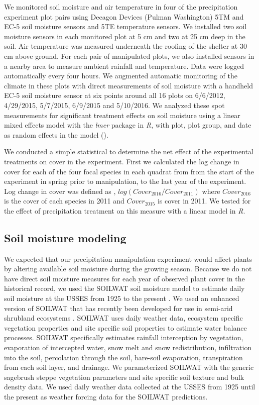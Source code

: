 \documentclass[11pt]{article}
\begin{document}
\begin{doublespace}
We monitored soil moisture and air temperature in four of the precipitation experiment plot pairs using Decagon Devices (Pulman Washington) 5TM and EC-5 soil moisture sensors and 5TE temperature sensors.  We installed two soil moisture sensors in each monitored plot at 5 cm and two at 25 cm deep in the soil.  Air temperature was measured underneath the roofing of the shelter at 30 cm above ground. For each pair of manipulated plots, we also installed sensors in a nearby area to measure ambient rainfall and temperature. Data were logged automatically every four hours. We augmented automatic monitoring of the climate in these plots with direct measurements of soil moisture with a handheld EC-5 soil moisture sensor at six points around all 16 plots on 6/6/2012, 4/29/2015, 5/7/2015, 6/9/2015 and 5/10/2016. We analyzed these spot measurements for significant treatment effects on soil moisture using a linear mixed effects model with the \textit{lmer} package in \textit{R}, with plot, plot group, and date as random effects in the model (\citep{bates_fitting_2015}).    

We conducted a simple statistical to determine the net effect of the experimental treatments on cover in the experiment. First we calculated the log change in cover for each of the four focal species in each quadrat from from the start of the experiment in spring prior to manipulation, to the last year of the experiment. Log change in cover was defined as , $log(Cover_{2016}/Cover_{2011})$ where $Cover_{2016}$ is the cover of each species in 2011 and $Cover_{2015}$ is cover in 2011. We tested for the effect of precipitation treatment on this measure with a linear model in \textit{R}.

\subsection*{Soil moisture modeling}

We expected that our precipitation manipulation experiment would affect plants by altering available soil moisture during the growing season.  Because we do not have direct soil moisture measures for each year of observed plant cover in the historical record, we used the SOILWAT soil moisture model to estimate daily soil moisture at the USSES from 1925 to the present \citep{sala_long-term_1992}. We used an enhanced version of SOILWAT that has recently been developed for use in semi-arid shrubland ecosystems \citep{bradford_ecohydrology_2014}. SOILWAT uses daily weather data, ecosystem specific vegetation properties and site specific soil properties to estimate water balance processes. SOILWAT specifically estimates rainfall interception by vegetation, evaporation of intercepted water, snow melt and snow redistribution, infiltration into the soil, percolation through the soil, bare-soil evaporation, transpiration from each soil layer, and drainage. We parameterized SOILWAT with the generic sagebrush steppe vegetation parameters and site specific soil texture and bulk density data. We used daily weather data collected at the USSES from 1925 until the present as weather forcing data for the SOILWAT predictions.  


\end{doublespace}
\end{document}

